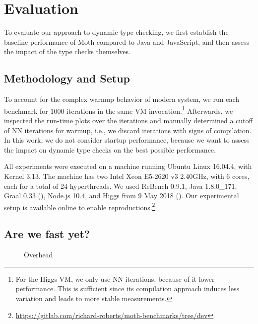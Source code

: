 
\section{Evaluation}
\label{sec:evaluation}


To evaluate our approach to dynamic type checking,
we first establish the baseline performance of Moth
compared to Java and JavaScript,
and then assess the impact of the type checks themselves.

\subsection{Methodology and Setup}

To account for the complex warmup behavior
of modern system\citep{Barrett:2017:VMW},
we run each benchmark for 1000 iterations in the same
VM invocation.\footnote{
For the Higgs VM, we only use NN iterations,
because of it lower performance.
This is sufficient since its compilation approach induces less variation
and leads to more stable measurements.}
Afterwards, we inspected the run-time plots over the iterations
and manually determined a cutoff of NN iterations for warmup,
i.e., we discard iterations with signs of compilation.
In this work, we do not consider startup performance,
because we want to assess the impact on dynamic type checks
on the best possible performance.

All experiments were executed on a machine running Ubuntu Linux 16.04.4,
with Kernel 3.13.
The machine has two Intel Xeon E5-2620 v3 2.40GHz,
with 6 cores, each for a total of 24 hyperthreads.
We used ReBench 0.9.1, Java 1.8.0\_171, Graal 0.33 (),
Node.js 10.4, and Higgs from 9 May 2018 ().
Our experimental setup is available online to enable reproductions.\footnote{
\url{https://gitlab.com/richard-roberts/moth-benchmarks/tree/dev}}


\subsection{Are we fast yet?}
\label{sec:baseline-perf}


\begin{figure}
	\AwfyBaseline{}
	\caption{Overhead}
	\label{fig:awfy-baseline}
\end{figure}


